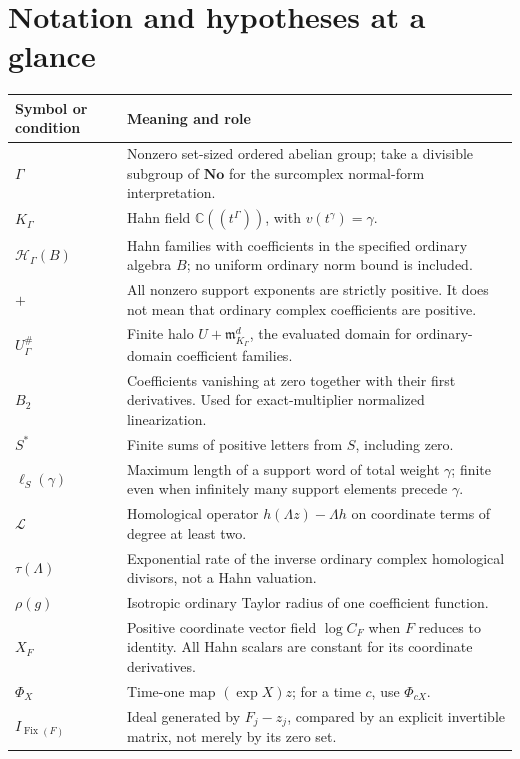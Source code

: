 \documentclass[11pt,letterpaper]{article}
\theoremstyle{definition}
\theoremstyle{remark}
\newcommand{\C}{\mathbb C}
\newcommand{\No}{\mathbf{No}}
\newcommand{\HH}{\mathscr H}
\newcommand{\m}{\mathfrak m}
\newcommand{\Fix}{\operatorname{Fix}}
\newcommand{\Li}{\mathcal L}
\numberwithin{equation}{section}
\begin{document}
\section{Notation and hypotheses at a glance}\label{app:notation}
\begin{longtable}{@{}P{0.23\textwidth}P{0.70\textwidth}@{}}
\toprule
Symbol or condition & Meaning and role\\
\midrule
\endhead
$\Gamma$ & Nonzero set-sized ordered abelian group; take a divisible
subgroup of $\No$ for the surcomplex normal-form interpretation.\\[0.35em]
$K_\Gamma$ & Hahn field $\C((t^\Gamma))$, with $v(t^\gamma)=\gamma$.\\[0.35em]
$\HH_\Gamma(B)$ & Hahn families with coefficients in the specified ordinary
algebra $B$; no uniform ordinary norm bound is included.\\[0.35em]
$+$ & All nonzero support exponents are strictly positive. It does not mean
that ordinary complex coefficients are positive.\\[0.35em]
$U_\Gamma^\#$ & Finite halo $U+\m_{K_\Gamma}^d$, the evaluated domain for
ordinary-domain coefficient families.\\[0.35em]
$B_2$ & Coefficients vanishing at zero together with their first derivatives.
Used for exact-multiplier normalized linearization.\\[0.35em]
$S^*$ & Finite sums of positive letters from $S$, including zero.\\[0.35em]
$\ell_S(\gamma)$ & Maximum length of a support word of total weight
$\gamma$; finite even when infinitely many support elements precede
$\gamma$.\\[0.35em]
$\Li$ & Homological operator $h(\Lambda z)-\Lambda h$ on coordinate terms
of degree at least two.\\[0.35em]
$\tau(\Lambda)$ & Exponential rate of the inverse ordinary complex
homological divisors, not a Hahn valuation.\\[0.35em]
$\rho(g)$ & Isotropic ordinary Taylor radius of one coefficient function.\\[0.35em]
$X_F$ & Positive coordinate vector field $\log C_F$ when $F$ reduces to
identity. All Hahn scalars are constant for its coordinate derivatives.\\[0.35em]
$\Phi_X$ & Time-one map $(\exp X)z$; for a time $c$, use $\Phi_{cX}$.\\[0.35em]
$I_{\Fix(F)}$ & Ideal generated by $F_j-z_j$, compared by an explicit
invertible matrix, not merely by its zero set.\\
\bottomrule
\end{longtable}
\end{document}
